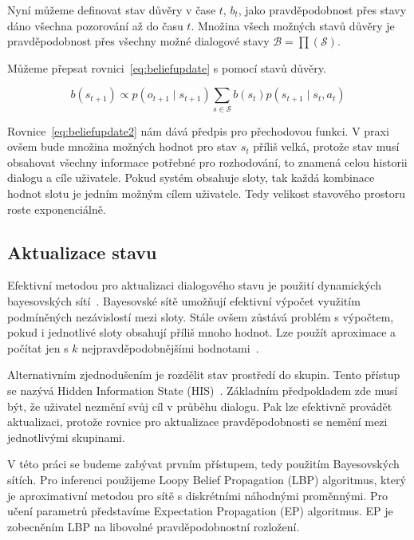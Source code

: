 Nyní můžeme definovat stav důvěry v čase $t$, $b_t$, jako pravděpodobnost přes stavy dáno všechna pozorování až do času $t$.
Množina všech možných stavů důvěry je pravděpodobnost přes všechny možné dialogové stavy $\mathcal{B} = \prod(\mathcal{S})$.

Můžeme přepsat rovnici~\eqref{eq:beliefupdate} s pomocí stavů důvěry.

\begin{equation}
b(s_{t+1}) \propto
    p(o_{t+1} \mid s_{t+1})
    \sum_{s \in \mathcal{S}}
        b(s_t)
        p(s_{t+1} \mid s_t, a_t)
\label{eq:beliefupdate2}
\end{equation}

Rovnice~\eqref{eq:beliefupdate2} nám dává předpis pro přechodovou funkci.
V praxi ovšem bude množina možných hodnot pro stav $s_t$ příliš velká, protože stav musí obsahovat všechny informace potřebné pro rozhodování, to znamená celou historii dialogu a cíle uživatele. 
Pokud systém obsahuje sloty, tak každá kombinace hodnot slotu je jedním možným cílem uživatele. 
Tedy velikost stavového prostoru roste exponenciálně.

\subsection{Aktualizace stavu}

Efektivní metodou pro aktualizaci dialogového stavu je použití dynamických bayesovských sítí~\cite{thomson2008bayesian}.
Bayesovské sítě umožňují efektivní výpočet využitím podmíněných nezávislostí mezi sloty.
Stále ovšem zůstává problém s výpočtem, pokud i jednotlivé sloty obsahují příliš mnoho hodnot.
Lze použít aproximace a počítat jen s $k$ nejpravděpodobnějšími hodnotami~\cite{thomson2010bayesian}.

Alternativním zjednodušením je rozdělit stav prostředí do skupin. 
Tento přístup se nazývá Hidden Information State (HIS)~\cite{young2010hidden}.
Základním předpokladem zde musí být, že uživatel nezmění svůj cíl v průběhu dialogu.
Pak lze efektivně provádět aktualizaci, protože rovnice pro aktualizace pravděpodobnosti se nemění mezi jednotlivými skupinami.

V této práci se budeme zabývat prvním přístupem, tedy použitím Bayesovských sítích.
Pro inferenci použijeme Loopy Belief Propagation (LBP) algoritmus, který je aproximativní metodou pro sítě s diskrétními náhodnými proměnnými.
Pro učení parametrů představíme Expectation Propagation (EP) algoritmus.
EP je zobecněním LBP na libovolné pravděpodobnostní rozložení.
